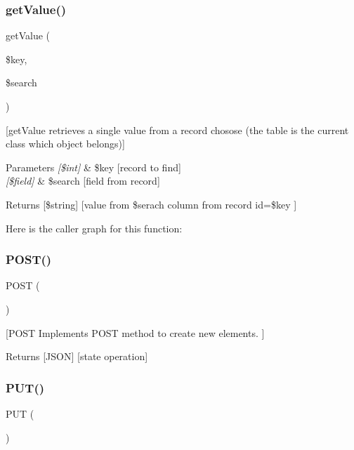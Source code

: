 \subsubsection{\texorpdfstring{get\+Value()}{getValue()}}
{\footnotesize\ttfamily get\+Value (\begin{DoxyParamCaption}\item[{}]{\$key,  }\item[{}]{\$search }\end{DoxyParamCaption})\hspace{0.3cm}{\ttfamily [protected]}}

\mbox{[}get\+Value retrieves a single value from a record chosose (the table is the current class which object belongs)\mbox{]} 
\begin{DoxyParams}{Parameters}
{\em \mbox{[}\$int\mbox{]}} & \$key \mbox{[}record to find\mbox{]} \\
\hline
{\em \mbox{[}\$field\mbox{]}} & \$search \mbox{[}field from record\mbox{]} \\
\hline
\end{DoxyParams}
\begin{DoxyReturn}{Returns}
\mbox{[}\$string\mbox{]} \mbox{[}value from \$serach column from record id=\$key \mbox{]} 
\end{DoxyReturn}
Here is the caller graph for this function\+:
\mbox{\label{class_resource_a2a7e865a6254f6af7005197d30ad1cc0}} 
\subsubsection{\texorpdfstring{P\+O\+S\+T()}{POST()}}
{\footnotesize\ttfamily P\+O\+ST (\begin{DoxyParamCaption}{ }\end{DoxyParamCaption})\hspace{0.3cm}{\ttfamily [protected]}}

\mbox{[}P\+O\+ST Implements P\+O\+ST method to create new elements. \mbox{]} \begin{DoxyReturn}{Returns}
\mbox{[}J\+S\+ON\mbox{]} \mbox{[}state operation\mbox{]} 
\end{DoxyReturn}
\mbox{\label{class_resource_a2a21af1d6aaaa31249485c753b86eba1}} 
\subsubsection{\texorpdfstring{P\+U\+T()}{PUT()}}
{\footnotesize\ttfamily P\+UT (\begin{DoxyParamCaption}{ }\end{DoxyParamCaption})\hspace{0.3cm}{\ttfamily [protected]}}

